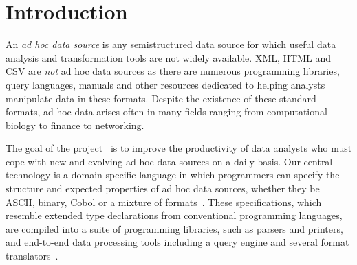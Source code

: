 \documentclass[preprint]{sig-alternate-sigmod08}
\begin{document}
\begin{abstract}
%
%
\end{abstract}

\section{Introduction}
An {\em ad hoc data source} is any semistructured data source
for which useful data analysis and transformation tools
are not widely available. XML, HTML and CSV are {\em not} 
ad hoc data sources as there are numerous programming libraries,
query languages, manuals and other resources dedicated to
helping analysts manipulate data in these formats.
Despite the existence of these standard formats, ad hoc data arises
often in many fields ranging from computational biology to finance to networking.

The goal of the \pads{} project~\cite{padsweb} is to improve the
productivity of data analysts who must cope with new and evolving
ad hoc data sources on a daily basis.  Our central technology is a
domain-specific language in which programmers can specify the
structure and expected properties of ad hoc data sources, whether they
be ASCII, binary, Cobol or a mixture of formats~\cite{fisher+:pads,fisher+:popl06}.  These
specifications, which resemble extended type declarations from
conventional programming languages, are compiled into a suite of
programming libraries, such as parsers and printers, and 
end-to-end data processing tools including a query engine 
and several format translators~\cite{fernandez+:padl,fernandez+:padx,mandelbaum+:pads-ml}.
\end{document}
